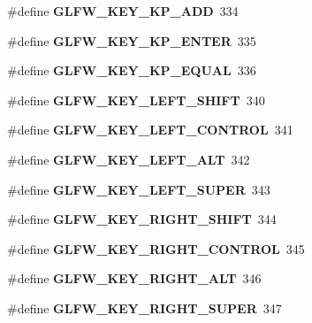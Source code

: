 \begin{DoxyCompactItemize}
\#define {\bfseries G\+L\+F\+W\+\_\+\+K\+E\+Y\+\_\+\+K\+P\+\_\+\+A\+DD}~334
\item 
\mbox{\label{group__keys_ga4f728f8738f2986bd63eedd3d412e8cf}} 
\#define {\bfseries G\+L\+F\+W\+\_\+\+K\+E\+Y\+\_\+\+K\+P\+\_\+\+E\+N\+T\+ER}~335
\item 
\mbox{\label{group__keys_gaebdc76d4a808191e6d21b7e4ad2acd97}} 
\#define {\bfseries G\+L\+F\+W\+\_\+\+K\+E\+Y\+\_\+\+K\+P\+\_\+\+E\+Q\+U\+AL}~336
\item 
\mbox{\label{group__keys_ga8a530a28a65c44ab5d00b759b756d3f6}} 
\#define {\bfseries G\+L\+F\+W\+\_\+\+K\+E\+Y\+\_\+\+L\+E\+F\+T\+\_\+\+S\+H\+I\+FT}~340
\item 
\mbox{\label{group__keys_ga9f97b743e81460ac4b2deddecd10a464}} 
\#define {\bfseries G\+L\+F\+W\+\_\+\+K\+E\+Y\+\_\+\+L\+E\+F\+T\+\_\+\+C\+O\+N\+T\+R\+OL}~341
\item 
\mbox{\label{group__keys_ga7f27dabf63a7789daa31e1c96790219b}} 
\#define {\bfseries G\+L\+F\+W\+\_\+\+K\+E\+Y\+\_\+\+L\+E\+F\+T\+\_\+\+A\+LT}~342
\item 
\mbox{\label{group__keys_gafb1207c91997fc295afd1835fbc5641a}} 
\#define {\bfseries G\+L\+F\+W\+\_\+\+K\+E\+Y\+\_\+\+L\+E\+F\+T\+\_\+\+S\+U\+P\+ER}~343
\item 
\mbox{\label{group__keys_gaffca36b99c9dce1a19cb9befbadce691}} 
\#define {\bfseries G\+L\+F\+W\+\_\+\+K\+E\+Y\+\_\+\+R\+I\+G\+H\+T\+\_\+\+S\+H\+I\+FT}~344
\item 
\mbox{\label{group__keys_gad1ca2094b2694e7251d0ab1fd34f8519}} 
\#define {\bfseries G\+L\+F\+W\+\_\+\+K\+E\+Y\+\_\+\+R\+I\+G\+H\+T\+\_\+\+C\+O\+N\+T\+R\+OL}~345
\item 
\mbox{\label{group__keys_ga687b38009131cfdd07a8d05fff8fa446}} 
\#define {\bfseries G\+L\+F\+W\+\_\+\+K\+E\+Y\+\_\+\+R\+I\+G\+H\+T\+\_\+\+A\+LT}~346
\item 
\mbox{\label{group__keys_gad4547a3e8e247594acb60423fe6502db}} 
\#define {\bfseries G\+L\+F\+W\+\_\+\+K\+E\+Y\+\_\+\+R\+I\+G\+H\+T\+\_\+\+S\+U\+P\+ER}~347

\end{DoxyCompactItemize}
